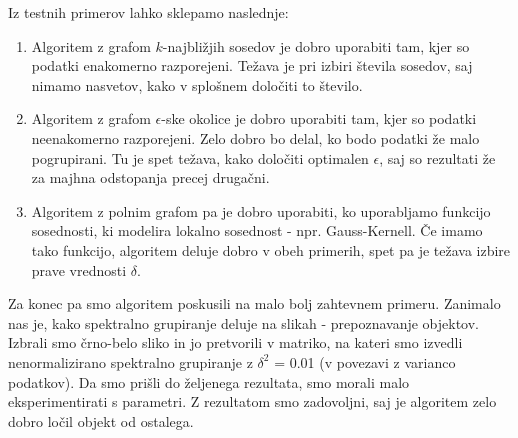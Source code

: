 \documentclass[a4paper, 10pt]{article}
\begin{document}
Iz testnih primerov lahko sklepamo naslednje:
\begin{enumerate}
\item Algoritem z grafom $k$-najbližjih sosedov je dobro uporabiti tam, kjer so podatki enakomerno razporejeni. Težava je pri izbiri števila sosedov, saj nimamo nasvetov, kako v splošnem določiti to število.
\item Algoritem z grafom $\epsilon$-ske okolice je dobro uporabiti tam, kjer so podatki neenakomerno razporejeni. Zelo dobro bo delal, ko bodo podatki že malo pogrupirani. Tu je spet težava, kako določiti optimalen $\epsilon$, saj so rezultati že za majhna odstopanja precej drugačni.
\item Algoritem z polnim grafom pa je dobro uporabiti, ko uporabljamo funkcijo sosednosti, ki modelira lokalno sosednost - npr. Gauss-Kernell. Če imamo tako funkcijo, algoritem deluje dobro v obeh primerih, spet pa je težava izbire prave vrednosti $\delta$. 
\end{enumerate}
Za konec pa smo algoritem poskusili na malo bolj zahtevnem primeru. Zanimalo nas je, kako spektralno grupiranje deluje na slikah - prepoznavanje objektov. Izbrali smo črno-belo sliko in jo pretvorili v matriko, na kateri smo izvedli nenormalizirano spektralno grupiranje z $\delta^2$ = 0.01 (v povezavi z varianco podatkov). Da smo prišli do željenega rezultata, smo morali malo eksperimentirati s parametri. Z rezultatom smo zadovoljni, saj je algoritem zelo dobro ločil objekt od ostalega.
\end{document}
